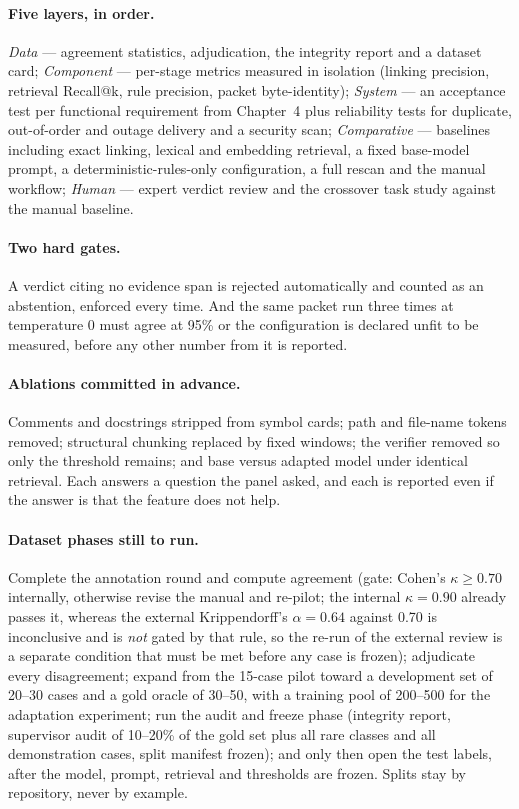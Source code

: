 \paragraph{Five layers, in order.}
\emph{Data} --- agreement statistics, adjudication, the integrity report and a
dataset card; \emph{Component} --- per-stage metrics measured in isolation
(linking precision, retrieval Recall@k, rule precision, packet byte-identity);
\emph{System} --- an acceptance test per functional requirement from
Chapter~4 plus reliability tests for duplicate, out-of-order and outage
delivery and a security scan; \emph{Comparative} --- baselines including exact
linking, lexical and embedding retrieval, a fixed base-model prompt, a
deterministic-rules-only configuration, a full rescan and the manual workflow;
\emph{Human} --- expert verdict review and the crossover task study against the
manual baseline.

\paragraph{Two hard gates.}
A verdict citing no evidence span is rejected automatically and counted as an
abstention, enforced every time. And the same packet run three times at
temperature 0 must agree at 95\% or the configuration is declared unfit to be
measured, before any other number from it is reported.

\paragraph{Ablations committed in advance.}
Comments and docstrings stripped from symbol cards; path and file-name tokens
removed; structural chunking replaced by fixed windows; the verifier removed so
only the threshold remains; and base versus adapted model under identical
retrieval. Each answers a question the panel asked, and each is reported even if
the answer is that the feature does not help.

\paragraph{Dataset phases still to run.}
Complete the annotation round and compute agreement (gate: Cohen's
$\kappa \geq 0.70$ internally, otherwise revise the manual and re-pilot; the
internal $\kappa = 0.90$ already passes it, whereas the external Krippendorff's
$\alpha = 0.64$ against 0.70 is inconclusive and is \emph{not} gated by that
rule, so the re-run of the external review is a separate condition that must be
met before any case is frozen); adjudicate every
disagreement; expand from the 15-case pilot toward a development set of 20--30
cases and a gold oracle of 30--50, with a training pool of 200--500 for the
adaptation experiment; run the audit and freeze phase (integrity report,
supervisor audit of 10--20\% of the gold set plus all rare classes and all
demonstration cases, split manifest frozen); and only then open the test labels,
after the model, prompt, retrieval and thresholds are frozen. Splits stay
by repository, never by example.

